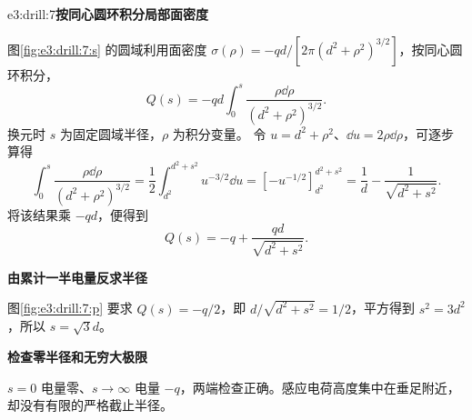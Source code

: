 \begin{drillsolution}{e3:drill:7}\textbf{按同心圆环积分局部面密度}\par\nobreak
图\ref{fig:e3:drill:7:s} 的圆域利用面密度 $\sigma(\rho)=-qd/[2\pi(d^2+\rho^2)^{3/2}]$，按同心圆环积分，
\[
 Q(s)=-qd\int_0^s\frac{\rho\dd\rho}{(d^2+\rho^2)^{3/2}}.
\]
换元时 $s$ 为固定圆域半径，$\rho$ 为积分变量。
令 $u=d^2+\rho^2$、$\dd u=2\rho\dd\rho$，可逐步算得
\[
 \int_0^s\frac{\rho\dd\rho}{(d^2+\rho^2)^{3/2}}
 =\frac12\int_{d^2}^{d^2+s^2}u^{-3/2}\dd u
 =[-u^{-1/2}]_{d^2}^{d^2+s^2}
 =\frac1d-\frac1{\sqrt{d^2+s^2}}.
\]
将该结果乘 $-qd$，便得到
\[
 Q(s)=-q+\frac{qd}{\sqrt{d^2+s^2}}.
\]



\par\medskip{}\noindent\textbf{由累计一半电量反求半径}\par\nobreak
图\ref{fig:e3:drill:7:p} 要求 $Q(s)=-q/2$，即 $d/\sqrt{d^2+s^2}=1/2$，平方得到 $s^2=3d^2$，所以 $s=\sqrt3d$。

\par\medskip{}\noindent\textbf{检查零半径和无穷大极限}\par\nobreak
$s=0$ 电量零、$s\to\infty$ 电量 $-q$，两端检查正确。感应电荷高度集中在垂足附近，却没有有限的严格截止半径。\end{drillsolution}
